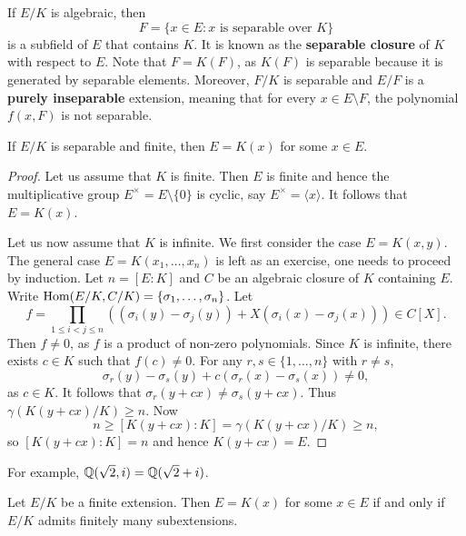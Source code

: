 \chapter{}

If $E/K$ is algebraic, then 
\[
    F=\{x\in E:x\text{ is separable over }K\}
\]
is a subfield of $E$ that contains $K$. It is known as 
the \textbf{separable closure} of $K$ with respect to $E$. 
Note that $F=K(F)$, as
$K(F)$ is separable because it is generated by separable elements. Moreover, 
$F/K$ is separable and 
$E/F$ is a \textbf{purely inseparable} extension, meaning that
for every $x\in E\setminus F$, the polynomial $f(x,F)$ is not separable. 

\begin{proposition}
\label{pro:monogenic}
    If $E/K$ is separable and finite, then $E=K(x)$ for some $x\in E$. 
\end{proposition}

\begin{proof}
    Let us assume that $K$ is finite. Then $E$ is finite and hence 
    the multiplicative group $E^{\times}=E\setminus\{0\}$ 
    is cyclic, say $E^{\times}=\langle x\rangle$. It follows
    that $E=K(x)$. 
    
    Let us now assume that $K$ is infinite. We first consider the case 
    $E=K(x,y)$. The general case $E=K(x_1,\dots,x_n)$ is left as an exercise, one needs to proceed by induction. 
    Let $n=[E:K]$ and 
    $C$ be an algebraic closure of $K$ containing $E$. 
    Write $\operatorname{Hom}(E/K,C/K)=\{\sigma_1,\dots,\sigma_n\}$. Let 
    \[
    f=\prod_{1\leq i<j\leq n}\left((\sigma_i(y)-\sigma_j(y))
    +X(\sigma_i(x)-\sigma_j(x))\right)\in C[X].
    \]
    Then $f\ne 0$, as $f$ is a product of non-zero polynomials. Since $K$ is infinite, 
    there exists $c\in K$ such that $f(c)\ne 0$. For any $r,s\in\{1,\dots,n\}$ with 
    $r\ne s$,
    \[
        \sigma_r(y)-\sigma_s(y)+c(\sigma_r(x)-\sigma_s(x))\ne 0,
    \]
    as $c\in K$. It follows that $\sigma_r(y+cx)\ne\sigma_s(y+cx)$. Thus $\gamma(K(y+cx)/K)\geq n$. 
    Now 
    \[
    n\geq [K(y+cx):K]=\gamma(K(y+cx)/K)\geq n,
    \]
    so $[K(y+cx):K]=n$ and
    hence $K(y+cx)=E$. 
\end{proof}

For example, $\mathbb{Q}(\sqrt{2},i)=\mathbb{Q}(\sqrt{2}+i)$. 

\begin{proposition}
    Let $E/K$ be a finite extension. Then $E=K(x)$ for some $x\in E$ 
    if and only if $E/K$ admits finitely many subextensions. 
\end{proposition}

